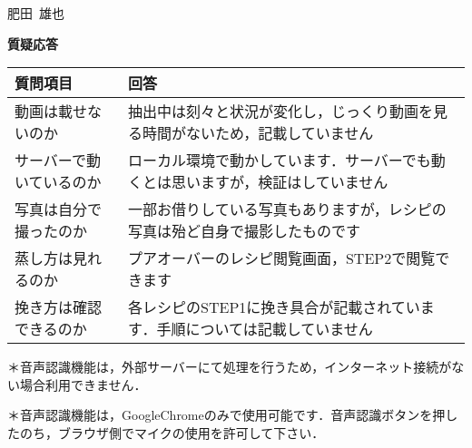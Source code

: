 \documentclass[a4j,10pt]{jsarticle}
\begin{document}
\begin{flushright}


肥田\ 雄也 %
\end{flushright}

\begin{center}
\textbf{ \LARGE{質疑応答} }
\end{center}


\begin{table}[h]
\begin{tabular}{|l|l|}
\hline
質問項目&回答                       \\ \hline
動画は載せないのか                   & 抽出中は刻々と状況が変化し，じっくり動画を見る時間がないため，記載していません  \\ \hline
サーバーで動いているのか                & ローカル環境で動かしています．サーバーでも動くとは思いますが，検証はしていません           \\ \hline
写真は自分で撮ったのか                 & 一部お借りしている写真もありますが，レシピの写真は殆ど自身で撮影したものです \\ \hline
蒸し方は見れるのか                   & プアオーバーのレシピ閲覧画面，STEP2で閲覧できます                        \\ \hline
挽き方は確認できるのか                 & 各レシピのSTEP1に挽き具合が記載されています．手順については記載していません    \\ \hline
\end{tabular}
\end{table}

＊音声認識機能は，外部サーバーにて処理を行うため，インターネット接続がない場合利用できません．

＊音声認識機能は，GoogleChromeのみで使用可能です．音声認識ボタンを押したのち，ブラウザ側でマイクの使用を許可して下さい．
\end{document}
